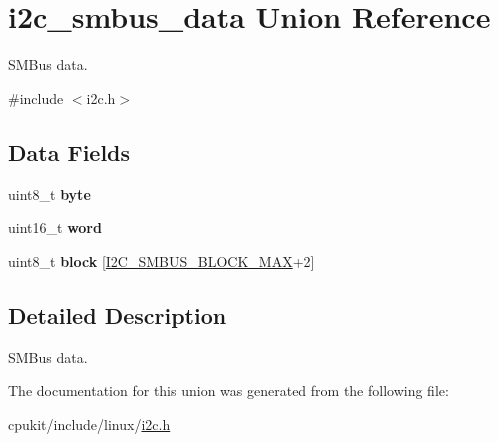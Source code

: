 \hypertarget{unioni2c__smbus__data}{}\section{i2c\+\_\+smbus\+\_\+data Union Reference}
\label{unioni2c__smbus__data}


S\+M\+Bus data.  




{\ttfamily \#include $<$i2c.\+h$>$}

\subsection*{Data Fields}
\begin{DoxyCompactItemize}
\item 
\mbox{\label{unioni2c__smbus__data_a7145699abf962d118aa1c78ff864e892}} 
uint8\+\_\+t {\bfseries byte}
\item 
\mbox{\label{unioni2c__smbus__data_ae8621bf131cbdfff90b21499a2c11a26}} 
uint16\+\_\+t {\bfseries word}
\item 
\mbox{\label{unioni2c__smbus__data_a56729c242baa246a3105fd7c64b86f48}} 
uint8\+\_\+t {\bfseries block} \mbox{[}\mbox{\hyperlink{group__I2CLinux_gac2dd8b77e329bba4a3ca9cd275f9bf50}{I2\+C\+\_\+\+S\+M\+B\+U\+S\+\_\+\+B\+L\+O\+C\+K\+\_\+\+M\+AX}}+2\mbox{]}
\end{DoxyCompactItemize}


\subsection{Detailed Description}
S\+M\+Bus data. 

The documentation for this union was generated from the following file\+:\begin{DoxyCompactItemize}
\item 
cpukit/include/linux/\mbox{\hyperlink{cpukit_2include_2linux_2i2c_8h}{i2c.\+h}}\end{DoxyCompactItemize}
